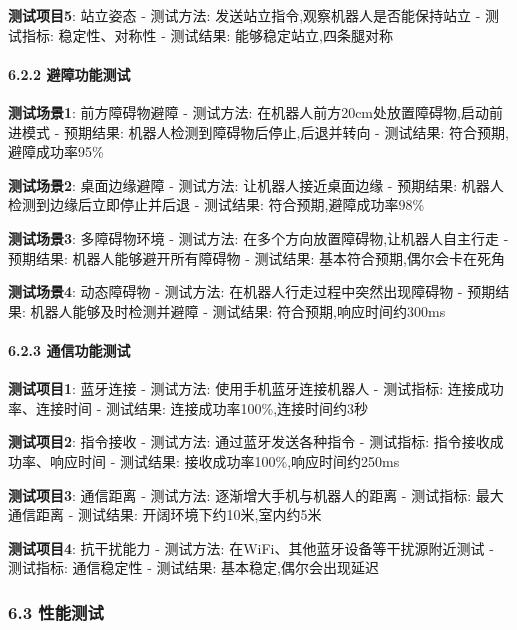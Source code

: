 \documentclass[
]{article}
\begin{document}
\textbf{测试项目5}: 站立姿态 - 测试方法:
发送站立指令,观察机器人是否能保持站立 - 测试指标: 稳定性、对称性 -
测试结果: 能够稳定站立,四条腿对称

\hypertarget{ux907fux969cux529fux80fdux6d4bux8bd5}{%
\paragraph{6.2.2
避障功能测试}\label{ux907fux969cux529fux80fdux6d4bux8bd5}}

\textbf{测试场景1}: 前方障碍物避障 - 测试方法:
在机器人前方20cm处放置障碍物,启动前进模式 - 预期结果:
机器人检测到障碍物后停止,后退并转向 - 测试结果: 符合预期,避障成功率95\%

\textbf{测试场景2}: 桌面边缘避障 - 测试方法: 让机器人接近桌面边缘 -
预期结果: 机器人检测到边缘后立即停止并后退 - 测试结果:
符合预期,避障成功率98\%

\textbf{测试场景3}: 多障碍物环境 - 测试方法:
在多个方向放置障碍物,让机器人自主行走 - 预期结果:
机器人能够避开所有障碍物 - 测试结果: 基本符合预期,偶尔会卡在死角

\textbf{测试场景4}: 动态障碍物 - 测试方法:
在机器人行走过程中突然出现障碍物 - 预期结果: 机器人能够及时检测并避障 -
测试结果: 符合预期,响应时间约300ms

\hypertarget{ux901aux4fe1ux529fux80fdux6d4bux8bd5}{%
\paragraph{6.2.3
通信功能测试}\label{ux901aux4fe1ux529fux80fdux6d4bux8bd5}}

\textbf{测试项目1}: 蓝牙连接 - 测试方法: 使用手机蓝牙连接机器人 -
测试指标: 连接成功率、连接时间 - 测试结果: 连接成功率100\%,连接时间约3秒

\textbf{测试项目2}: 指令接收 - 测试方法: 通过蓝牙发送各种指令 -
测试指标: 指令接收成功率、响应时间 - 测试结果:
接收成功率100\%,响应时间约250ms

\textbf{测试项目3}: 通信距离 - 测试方法: 逐渐增大手机与机器人的距离 -
测试指标: 最大通信距离 - 测试结果: 开阔环境下约10米,室内约5米

\textbf{测试项目4}: 抗干扰能力 - 测试方法:
在WiFi、其他蓝牙设备等干扰源附近测试 - 测试指标: 通信稳定性 - 测试结果:
基本稳定,偶尔会出现延迟

\hypertarget{ux6027ux80fdux6d4bux8bd5}{%
\subsubsection{6.3 性能测试}\label{ux6027ux80fdux6d4bux8bd5}}
\end{document}
